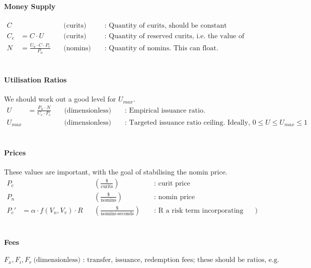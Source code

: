 \documentclass{article}
\begin{document}
\paragraph{Money Supply}
\begin{align*}
    C & \ && \text{(curits)} && \text{ : Quantity of curits, should be constant} \\
    C_e &= C \cdot U \ && \text{(curits)} && \text{ : Quantity of reserved curits, i.e. the value of tokens have been issued against } \\
    N &= \frac{U_a \cdot C \cdot P_c}{P_n} \ && \text{(nomins)} && \text{ : Quantity of nomins. This can float.}
\end{align*}
\\

\paragraph{Utilisation Ratios} We should work out a good level for \(U_{max}\).
\begin{align*}
    U &= \frac{P_n \cdot N}{C_e \cdot P_c} \ && \text{(dimensionless)} && \text{ : Empirical issuance ratio. } \\
    U_{max} & \ && \text{(dimensionless)} && \text{ : Targeted issuance ratio ceiling. Ideally, } 0 \leq U \leq U_{max} \leq 1
\end{align*}
\\

\paragraph{Prices} These values are important, with the goal of stabilising the nomin price.
\begin{align*}
    P_c & \ && (\frac{\text{\$}}{\text{curits}}) && \text{ : curit price} \\
    P_n & \ && (\frac{\text{\$}}{\text{nomins}}) && \text{ : nomin price} \\
    P_c' &= \alpha \cdot f(V_n, V_v) \cdot R && (\frac{\text{\$}}{\text{nomins} \cdot \text{seconds}}) && \text{ : R a risk term incorporating volatility? \#buyers - \#sellers?})
\end{align*}
\\

\paragraph{Fees}
\[F_x, F_i, F_r \ \text{(dimensionless) : transfer, issuance, redemption fees; these should be ratios, e.g. 0.1\%}\]
\\
\end{document}
